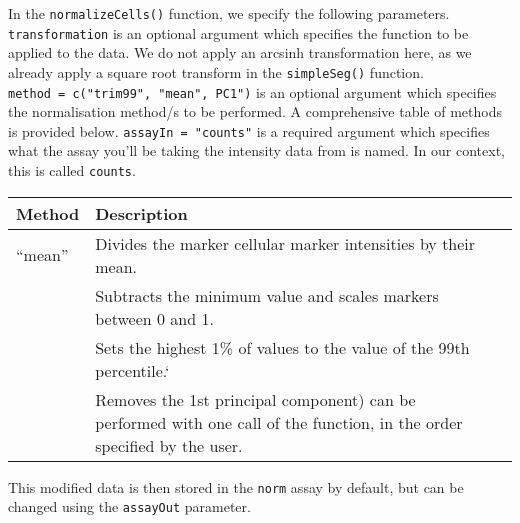 \documentclass[
  letterpaper,
  DIV=11,
  numbers=noendperiod]{scrreprt}
\begin{document}
In the \texttt{normalizeCells()} function, we specify the following
parameters. \texttt{transformation} is an optional argument which
specifies the function to be applied to the data. We do not apply an
arcsinh transformation here, as we already apply a square root transform
in the \texttt{simpleSeg()} function.
\texttt{method\ =\ c("trim99",\ "mean",\ PC1")} is an optional argument
which specifies the normalisation method/s to be performed. A
comprehensive table of methods is provided below.
\texttt{assayIn\ =\ "counts"} is a required argument which specifies
what the assay you'll be taking the intensity data from is named. In our
context, this is called \texttt{counts}.

\begin{longtable}[]{@{}
  >{\raggedright\arraybackslash}p{}
  >{\centering\arraybackslash}p{}
  >{\centering\arraybackslash}p{}@{}}
\toprule\noalign{}
\begin{minipage}[b]{\linewidth}\raggedright
Method
\end{minipage} & \begin{minipage}[b]{\linewidth}\centering
Description
\end{minipage} & \begin{minipage}[b]{\linewidth}\centering
\end{minipage} \\
\midrule\noalign{}
\endhead
\bottomrule\noalign{}
\endlastfoot
{``mean''} & {Divides the marker cellular marker intensities by their
mean.} & \\
{``minMax''} & {Subtracts the minimum value and scales markers between 0
and 1.} & \\
{``trim99''} & {Sets the highest 1\% of values to the value of the 99th
percentile.`} & \\
{``PC1''} & {Removes the 1st principal component) can be performed with
one call of the function, in the order specified by the user.} & \\
\end{longtable}

This modified data is then stored in the \texttt{norm} assay by default,
but can be changed using the \texttt{assayOut} parameter.
\end{document}
